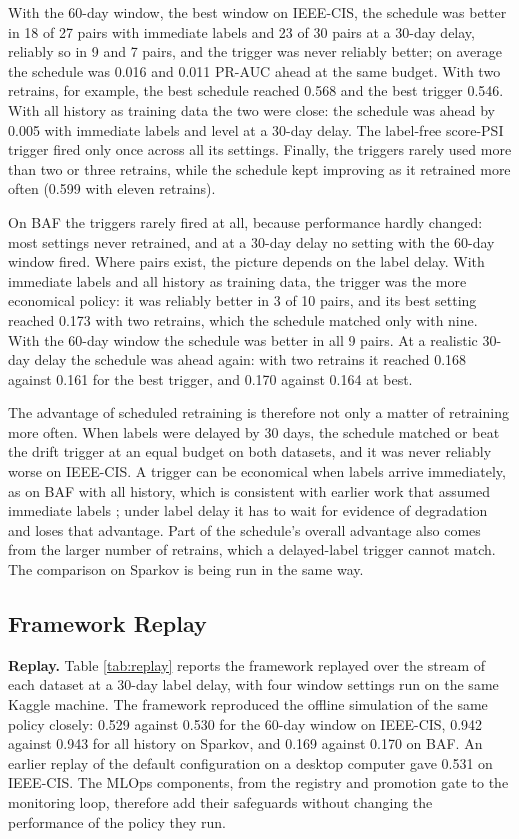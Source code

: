 With the 60-day window, the best window on IEEE-CIS, the schedule was better in 18 of 27 pairs with immediate labels and 23 of 30 pairs at a 30-day delay, reliably so in 9 and 7 pairs, and the trigger was never reliably better; on average the schedule was 0.016 and 0.011 PR-AUC ahead at the same budget. With two retrains, for example, the best schedule reached 0.568 and the best trigger 0.546. With all history as training data the two were close: the schedule was ahead by 0.005 with immediate labels and level at a 30-day delay. The label-free score-PSI trigger fired only once across all its settings. Finally, the triggers rarely used more than two or three retrains, while the schedule kept improving as it retrained more often (0.599 with eleven retrains).

On BAF the triggers rarely fired at all, because performance hardly changed: most settings never retrained, and at a 30-day delay no setting with the 60-day window fired. Where pairs exist, the picture depends on the label delay. With immediate labels and all history as training data, the trigger was the more economical policy: it was reliably better in 3 of 10 pairs, and its best setting reached 0.173 with two retrains, which the schedule matched only with nine. With the 60-day window the schedule was better in all 9 pairs. At a realistic 30-day delay the schedule was ahead again: with two retrains it reached 0.168 against 0.161 for the best trigger, and 0.170 against 0.164 at best.

The advantage of scheduled retraining is therefore not only a matter of retraining more often. When labels were delayed by 30 days, the schedule matched or beat the drift trigger at an equal budget on both datasets, and it was never reliably worse on IEEE-CIS. A trigger can be economical when labels arrive immediately, as on BAF with all history, which is consistent with earlier work that assumed immediate labels \cite{yelleti2025}; under label delay it has to wait for evidence of degradation and loses that advantage. Part of the schedule's overall advantage also comes from the larger number of retrains, which a delayed-label trigger cannot match. The comparison on Sparkov is being run in the same way.

\subsection{Framework Replay}\label{sec:replay5}

\textbf{Replay.} Table \ref{tab:replay} reports the framework replayed over the stream of each dataset at a 30-day label delay, with four window settings run on the same Kaggle machine. The framework reproduced the offline simulation of the same policy closely: 0.529 against 0.530 for the 60-day window on IEEE-CIS, 0.942 against 0.943 for all history on Sparkov, and 0.169 against 0.170 on BAF. An earlier replay of the default configuration on a desktop computer gave 0.531 on IEEE-CIS. The MLOps components, from the registry and promotion gate to the monitoring loop, therefore add their safeguards without changing the performance of the policy they run.

